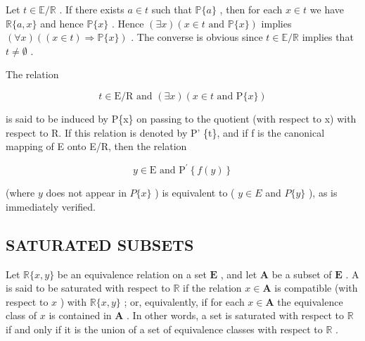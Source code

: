 Let \(t \in \mathbb{E} / \mathbb{R}\) . If there exists \(a \in t\) such that \(\mathbb{P}\{a\}\) , then for each \(x \in t\) we have \(\mathbb{R}\{a, x\}\) and hence \(\mathbb{P}\{x\}\) . Hence \((\exists x)(x \in t \text{ and } \mathbb{P}\{x\})\) implies \((\forall x)((x \in t) \Longrightarrow \mathbb{P}\{x\})\) . The converse is obvious since \(t \in \mathbb{E} / \mathbb{R}\) implies that \(t \neq \emptyset\) .

The relation

\[
t \in \mathrm{E} / \mathrm{R} \text { and } (\exists x) (x \in t \text { and } \mathrm{P} \{x \})
\]

is said to be induced by P\{x\} on passing to the quotient (with respect to x) with respect to R. If this relation is denoted by P' \{t\}, and if f is the canonical mapping of E onto E/R, then the relation

\[
y \in \mathrm{E} \text {   and   } \mathrm{P} ^ {\prime} \left\{f (y) \right\}
\]

(where \(y\) does not appear in \(P\{x\}\) ) is equivalent to ( \(y \in E\) and \(P\{y\}\) ), as is immediately verified.

\subsection{SATURATED SUBSETS}

Let \(\mathbb{R}\{x, y\}\) be an equivalence relation on a set \(\mathbf{E}\) , and let \(\mathbf{A}\) be a subset of \(\mathbf{E}\) . A is said to be saturated with respect to \(\mathbb{R}\) if the relation \(x \in \mathbf{A}\) is compatible (with respect to \(x\) ) with \(\mathbb{R}\{x, y\}\) ; or, equivalently, if for each \(x \in \mathbf{A}\) the equivalence class of \(x\) is contained in \(\mathbf{A}\) . In other words, a set is saturated with respect to \(\mathbb{R}\) if and only if it is the union of a set of equivalence classes with respect to \(\mathbb{R}\) .

